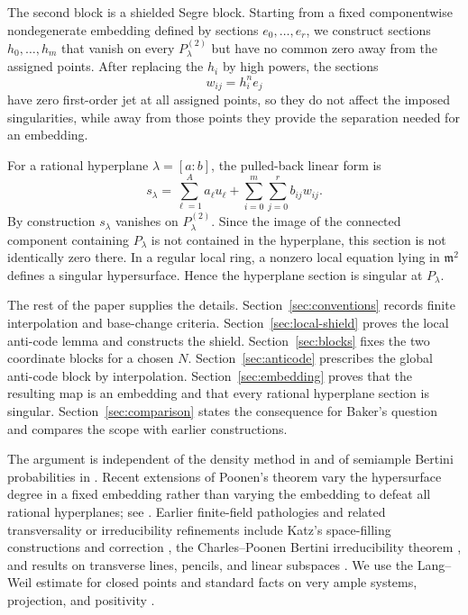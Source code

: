\documentclass{lms}
\newcommand{\mm}{\mathfrak m}
\begin{document}
The second block is a shielded Segre block.  Starting from a fixed componentwise nondegenerate embedding defined by sections $e_0,\ldots,e_r$, we construct sections $h_0,\ldots,h_m$ that vanish on every $P_\lambda^{(2)}$ but have no common zero away from the assigned points.  After replacing the $h_i$ by high powers, the sections
\[
        w_{ij}=h_i^n e_j
\]
have zero first-order jet at all assigned points, so they do not affect the imposed singularities, while away from those points they provide the separation needed for an embedding.

For a rational hyperplane $\lambda=[a:b]$, the pulled-back linear form is
\[
        s_\lambda=
        \sum_{\ell=1}^{A}a_\ell u_\ell+
        \sum_{i=0}^{m}\sum_{j=0}^{r}b_{ij}w_{ij}.
\]
By construction $s_\lambda$ vanishes on $P_\lambda^{(2)}$.  Since the image of the connected component containing $P_\lambda$ is not contained in the hyperplane, this section is not identically zero there.  In a regular local ring, a nonzero local equation lying in $\mm^2$ defines a singular hypersurface.  Hence the hyperplane section is singular at $P_\lambda$.

The rest of the paper supplies the details.  Section~\ref{sec:conventions} records finite interpolation and base-change criteria.  Section~\ref{sec:local-shield} proves the local anti-code lemma and constructs the shield.  Section~\ref{sec:blocks} fixes the two coordinate blocks for a chosen $N$.  Section~\ref{sec:anticode} prescribes the global anti-code block by interpolation.  Section~\ref{sec:embedding} proves that the resulting map is an embedding and that every rational hyperplane section is singular.  Section~\ref{sec:comparison} states the consequence for Baker's question and compares the scope with earlier constructions.

The argument is independent of the density method in \cite{Poonen2004} and of semiample Bertini probabilities in \cite{ErmanWood2015}.  Recent extensions of Poonen's theorem vary the hypersurface degree in a fixed embedding rather than varying the embedding to defeat all rational hyperplanes; see \cite{Poonen2008,BucurKedlaya2012,BiluHowe2021,Bertucci2025,GhoshKrishna2023}.  Earlier finite-field pathologies and related transversality or irreducibility refinements include Katz's space-filling constructions and correction \cite{Katz1999,Katz2001}, the Charles--Poonen Bertini irreducibility theorem \cite{CharlesPoonen2016}, and results on transverse lines, pencils, and linear subspaces \cite{Asgarli2019,AsgarliGhioca2022,AsgarliDuanLai2024}.  We use the Lang--Weil estimate for closed points \cite{LangWeil1954} and standard facts on very ample systems, projection, and positivity \cite{Hartshorne1977,Jouanolou1983,Lazarsfeld2004}.
\end{document}
